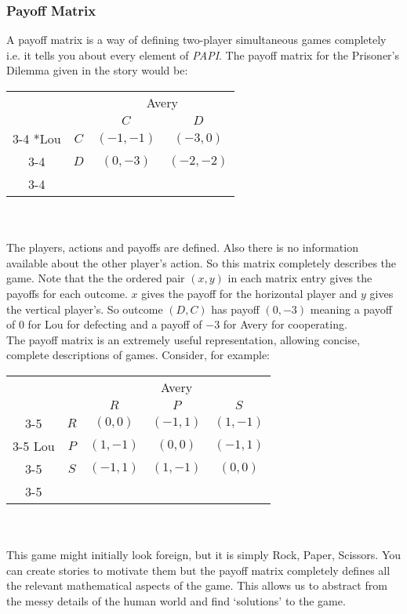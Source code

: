 \subsubsection{Payoff Matrix}
A payoff matrix is a way of defining two-player simultaneous games completely i.e. it tells you about every element of \textit{PAPI}. The payoff matrix for the Prisoner's Dilemma given in the story would be:\\
\setlength{\extrarowheight}{2pt}
\begin{tabular}{cc|c|c|}
	& \multicolumn{1}{c}{} & \multicolumn{2}{c}{Avery}\\
	& \multicolumn{1}{c}{} & \multicolumn{1}{c}{$C$}  & \multicolumn{1}{c}{$D$} \\\cline{3-4}
	\multirow{2}*{Lou}  & $C$ & $(-1,-1)$ & $(-3,0)$ \\\cline{3-4}
	& $D$ & $(0,-3)$ & $(-2,-2)$ \\\cline{3-4}
\end{tabular}
\\
\\
The players, actions and payoffs are defined. Also there is no information available about the other player's action. So this matrix completely describes the game. Note that the the ordered pair $(x,y)$ in each matrix entry gives the payoffs for each outcome. $x$ gives the payoff for the horizontal player and $y$ gives the vertical player's. So outcome $(D,C)$ has payoff $(0,-3)$ meaning a payoff of $0$ for Lou for defecting and a payoff of $-3$ for Avery for cooperating.\\
The payoff matrix is an extremely useful representation, allowing concise, complete descriptions of games. Consider, for example:\\
\setlength{\extrarowheight}{2pt}
\begin{tabular}{cc|c|c|c|}
	& \multicolumn{1}{c}{} & \multicolumn{3}{c}{Avery} \\
	& \multicolumn{1}{c}{} & \multicolumn{1}{c}{$R$}  & \multicolumn{1}{c}{$P$}  & \multicolumn{1}{c}{$S$} \\\cline{3-5}
	& $R$ & $(0,0)$ & $(-1,1)$ & $(1,-1)$ \\ \cline{3-5}
	Lou  & $P$ & $(1,-1)$ & $(0,0)$ & $(-1,1)$ \\\cline{3-5}
	& $S$ & $(-1,1)$ & $(1,-1)$ & $(0,0)$ \\\cline{3-5}
\end{tabular}
\\
\\
This game might initially look foreign, but it is simply Rock, Paper, Scissors. You can create stories to motivate them but the payoff matrix completely defines all the relevant mathematical aspects of the game. This allows us to abstract from the messy details of the human world and find `solutions' to the game.
